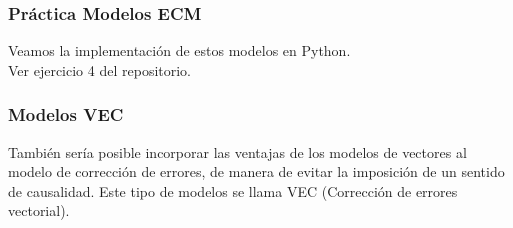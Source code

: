 \documentclass{beamer}
\begin{document}
\begin{frame}
\frametitle{Práctica Modelos ECM}
Veamos la implementación de estos modelos en Python. \\
\vspace{5mm} %
Ver ejercicio 4 del repositorio.\\
\end{frame}

\begin{frame}
\frametitle{Modelos VEC}
También sería posible incorporar las ventajas de los modelos de vectores al modelo de corrección de errores, de manera de evitar la imposición de un sentido de causalidad. Este tipo de modelos se llama VEC (Corrección de errores vectorial). 
\end{frame}
\end{document}
